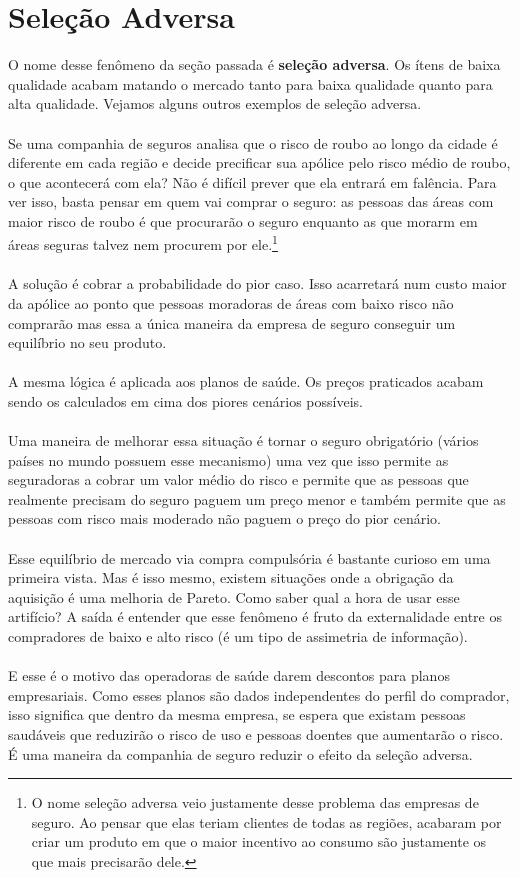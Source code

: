 \documentclass[a4paper,11pt,oneside]{book}
\theoremstyle{definition}
\theoremstyle{break}
\begin{document}
\section{Seleção Adversa}

O nome desse fenômeno da seção passada é \textbf{seleção adversa}. Os ítens de baixa qualidade acabam matando o mercado tanto para baixa qualidade quanto para alta qualidade. Vejamos alguns outros exemplos de seleção adversa.
\\~\\
Se uma companhia de seguros analisa que o risco de roubo ao longo da cidade é diferente em cada região e decide precificar sua apólice pelo risco médio de roubo, o que acontecerá com ela? Não é difícil prever que ela entrará em falência. Para ver isso, basta pensar em quem vai comprar o seguro: as pessoas das áreas com maior risco de roubo é que procurarão o seguro enquanto as que morarm em áreas seguras talvez nem procurem por ele.\footnote{O nome seleção adversa veio justamente desse problema das empresas de seguro. Ao pensar que elas teriam clientes de todas as regiões, acabaram por criar um produto em que o maior incentivo ao consumo são justamente os que mais precisarão dele.}
\\~\\
A solução é cobrar a probabilidade do pior caso. Isso acarretará num custo maior da apólice ao ponto que pessoas moradoras de áreas com baixo risco não comprarão mas essa a única maneira da empresa de seguro conseguir um equilíbrio no seu produto.
\\~\\
A mesma lógica é aplicada aos planos de saúde. Os preços praticados acabam sendo os calculados em cima dos piores cenários possíveis.
\\~\\
Uma maneira de melhorar essa situação é tornar o seguro obrigatório (vários países no mundo possuem esse mecanismo) uma vez que isso permite as seguradoras a cobrar um valor médio do risco e permite que as pessoas que realmente precisam do seguro paguem um preço menor e também permite que as pessoas com risco mais moderado não paguem o preço do pior cenário.
\\~\\
Esse equilíbrio de mercado via compra compulsória é bastante curioso em uma primeira vista. Mas é isso mesmo, existem situações onde a obrigação da aquisição é uma melhoria de Pareto. Como saber qual a hora de usar esse artifício? A saída é entender que esse fenômeno é fruto da externalidade entre os compradores de baixo e alto risco (é um tipo de assimetria de informação).
\\~\\
E esse é o motivo das operadoras de saúde darem descontos para planos empresariais. Como esses planos são dados independentes do perfil do comprador, isso significa que dentro da mesma empresa, se espera que existam pessoas saudáveis que reduzirão o risco de uso e pessoas doentes que aumentarão o risco. É uma maneira da companhia de seguro reduzir o efeito da seleção adversa.
\end{document}

